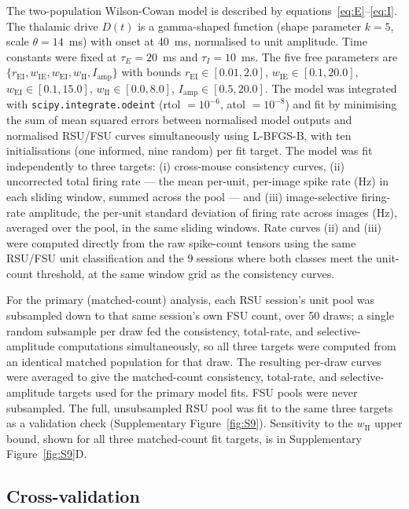 \documentclass[11pt,onecolumn]{article}
\begin{document}
The two-population Wilson-Cowan model \citep{wilson1972} is described by
equations~\eqref{eq:E}--\eqref{eq:I}.  The thalamic drive $D(t)$ is a
gamma-shaped function (shape parameter $k = 5$, scale $\theta = 14$~ms)
with onset at 40~ms, normalised to unit amplitude.  Time constants were
fixed at $\tau_E = 20$~ms and $\tau_I = 10$~ms.  The five free
parameters are $\{r_\mathrm{EI}, w_\mathrm{IE}, w_\mathrm{EI},
w_\mathrm{II}, I_\mathrm{amp}\}$ with bounds $r_\mathrm{EI} \in
[0.01, 2.0]$, $w_\mathrm{IE} \in [0.1, 20.0]$,
$w_\mathrm{EI} \in [0.1, 15.0]$, $w_\mathrm{II} \in [0.0, 8.0]$,
$I_\mathrm{amp} \in [0.5, 20.0]$.  The model was integrated with
\texttt{scipy.integrate.odeint} (rtol $= 10^{-6}$, atol $= 10^{-8}$)
and fit by minimising the sum of mean squared errors between
normalised model outputs and normalised RSU/FSU curves simultaneously
using L-BFGS-B, with ten initialisations (one informed, nine random) per
fit target.  The model was fit independently to three targets: (i)
cross-mouse consistency curves, (ii) uncorrected total firing rate ---
the mean per-unit, per-image spike rate (Hz) in each sliding window,
summed across the pool --- and (iii) image-selective firing-rate
amplitude, the per-unit standard deviation of firing rate across images
(Hz), averaged over the pool, in the same sliding windows.  Rate curves
(ii) and (iii) were computed directly from the raw spike-count tensors
using the same RSU/FSU unit classification and the 9 sessions
where both classes meet the unit-count threshold, at the same window
grid as the consistency curves.

For the primary (matched-count) analysis, each RSU session's unit pool
was subsampled down to that same session's own FSU count, over 50 draws;
a single random subsample per draw fed the consistency, total-rate, and
selective-amplitude computations simultaneously, so all three targets
were computed from an identical matched population for that draw.  The
resulting per-draw curves were averaged to give the matched-count
consistency, total-rate, and selective-amplitude targets used for the
primary model fits.  FSU pools were never subsampled.  The full,
unsubsampled RSU pool was fit to the same three targets as a validation
check (Supplementary Figure~\ref{fig:S9}).  Sensitivity to the
$w_\mathrm{II}$ upper bound, shown for all three matched-count fit
targets, is in Supplementary Figure~\ref{fig:S9}D.

\subsection{Cross-validation}
\end{document}
